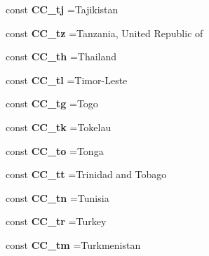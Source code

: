 \begin{DoxyCompactItemize}
\item 
\hypertarget{class_i_s_o_a3e38ee8cf2a4d33e0001e078343a7626}{}\label{class_i_s_o_a3e38ee8cf2a4d33e0001e078343a7626} 
const {\bfseries C\+C\+\_\+tj} =\textquotesingle{}Tajikistan\textquotesingle{}
\item 
\hypertarget{class_i_s_o_a538003521fe825fc053b92bb83ae5188}{}\label{class_i_s_o_a538003521fe825fc053b92bb83ae5188} 
const {\bfseries C\+C\+\_\+tz} =\textquotesingle{}Tanzania, United Republic of\textquotesingle{}
\item 
\hypertarget{class_i_s_o_a244261e69904376c07315c3ba5637e18}{}\label{class_i_s_o_a244261e69904376c07315c3ba5637e18} 
const {\bfseries C\+C\+\_\+th} =\textquotesingle{}Thailand\textquotesingle{}
\item 
\hypertarget{class_i_s_o_a8202d8551f9cdf9a1f675054a399b6d1}{}\label{class_i_s_o_a8202d8551f9cdf9a1f675054a399b6d1} 
const {\bfseries C\+C\+\_\+tl} =\textquotesingle{}Timor-\/Leste\textquotesingle{}
\item 
\hypertarget{class_i_s_o_ad6b844ce6ee8908519f6f4f46bdf4424}{}\label{class_i_s_o_ad6b844ce6ee8908519f6f4f46bdf4424} 
const {\bfseries C\+C\+\_\+tg} =\textquotesingle{}Togo\textquotesingle{}
\item 
\hypertarget{class_i_s_o_a1bd4a9f2a449d8f0d91798593b34c474}{}\label{class_i_s_o_a1bd4a9f2a449d8f0d91798593b34c474} 
const {\bfseries C\+C\+\_\+tk} =\textquotesingle{}Tokelau\textquotesingle{}
\item 
\hypertarget{class_i_s_o_aaabcd58614a2b565dc96ebcc892e10aa}{}\label{class_i_s_o_aaabcd58614a2b565dc96ebcc892e10aa} 
const {\bfseries C\+C\+\_\+to} =\textquotesingle{}Tonga\textquotesingle{}
\item 
\hypertarget{class_i_s_o_a6ee1f00af0fec8b8a9453f199d6800e7}{}\label{class_i_s_o_a6ee1f00af0fec8b8a9453f199d6800e7} 
const {\bfseries C\+C\+\_\+tt} =\textquotesingle{}Trinidad and Tobago\textquotesingle{}
\item 
\hypertarget{class_i_s_o_a7b3e8585353defd5f2e3f4af453aeb2a}{}\label{class_i_s_o_a7b3e8585353defd5f2e3f4af453aeb2a} 
const {\bfseries C\+C\+\_\+tn} =\textquotesingle{}Tunisia\textquotesingle{}
\item 
\hypertarget{class_i_s_o_a91a38e2acb39061be5dc0d007703b5a0}{}\label{class_i_s_o_a91a38e2acb39061be5dc0d007703b5a0} 
const {\bfseries C\+C\+\_\+tr} =\textquotesingle{}Turkey\textquotesingle{}
\item 
\hypertarget{class_i_s_o_a34872666ae6c9cfa3a6ddb1d13d24678}{}\label{class_i_s_o_a34872666ae6c9cfa3a6ddb1d13d24678} 
const {\bfseries C\+C\+\_\+tm} =\textquotesingle{}Turkmenistan\textquotesingle{}

\end{DoxyCompactItemize}
